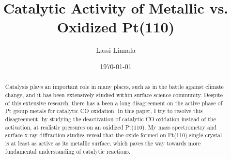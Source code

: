 \documentclass[aps,prl,groupedaddress,twocolumn]{revtex4-1}
\begin{document}

\title{Catalytic Activity of Metallic vs. Oxidized Pt(110)}


\author{Lassi Linnala}


\date{\today}

\begin{abstract}
Catalysis plays an important role in many places, such as in the battle against climate change, and it has been extensively studied within surface science community. Despite of this extensive research, there has a been a long disagreement on the active phase of Pt group metals for catalytic CO oxidation.  In this paper, I try to resolve this disagreement, by studying the deactivation of catalytic CO oxidation instead of the activation, at realistic pressures on an oxidized Pt(110). My mass spectrometry and surface x-ray diffraction studies reveal that the oxide formed on Pt(110) single crystal is at least as active as its metallic surface, which paves the way towards more fundamental understanding of catalytic reactions.

\end{abstract}
\end{document}
